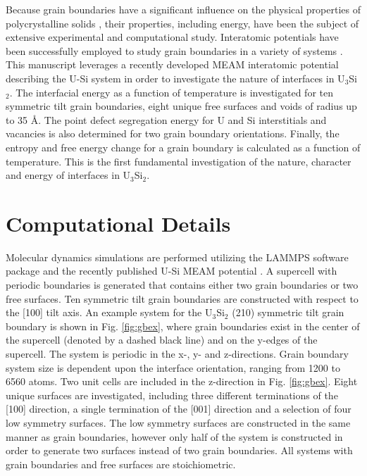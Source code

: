 \documentclass[review]{elsarticle}
\begin{document}
Because grain boundaries have a significant influence on the physical properties of polycrystalline solids \cite{brandon2010, harmer2010}, their properties, including energy, have been the subject of extensive experimental and computational study. Interatomic potentials have been successfully employed to study grain boundaries in a variety of systems \cite{morita1997, wolf1989bcc1, wolf1990bcc2, ratanaphan2015, novoselov2014, tschopp2012probing, hahn2016}. This manuscript leverages a recently developed MEAM interatomic potential describing the U-Si system in order to investigate the nature of interfaces in U$_{3}$Si$_{2}$. The interfacial energy as a function of temperature is investigated for ten symmetric tilt grain boundaries, eight unique free surfaces and voids of radius up to 35 {\AA}. The point defect segregation energy for U and Si interstitials and vacancies is also determined for two grain boundary orientations. Finally, the entropy and free energy change for a grain boundary is calculated as a function of temperature. This is the first fundamental investigation of the nature, character and energy of interfaces in U$_{3}$Si$_{2}$. 

\section{Computational Details}
Molecular dynamics simulations are performed utilizing the LAMMPS \cite{plimpton1995} software package and the recently published U-Si MEAM potential \cite{beelerUSi}. A supercell with periodic boundaries is generated that contains either two grain boundaries or two free surfaces. Ten symmetric tilt grain boundaries are constructed with respect to the [100] tilt axis. An example system for the U$_{3}$Si$_{2}$ (210) symmetric tilt grain boundary is shown in Fig. \ref{fig:gbex}, where grain boundaries exist in the center of the supercell (denoted by a dashed black line) and on the y-edges of the supercell. The system is periodic in the x-, y- and z-directions. Grain boundary system size is dependent upon the interface orientation, ranging from 1200 to 6560 atoms. Two unit cells are included in the z-direction in Fig. \ref{fig:gbex}. Eight unique surfaces are investigated, including three different terminations of the [100] direction, a single termination of the [001] direction and a selection of four low symmetry surfaces. The low symmetry surfaces are constructed in the same manner as grain boundaries, however only half of the system is constructed in order to generate two surfaces instead of two grain boundaries. All systems with grain boundaries and free surfaces are stoichiometric. 
\end{document}
